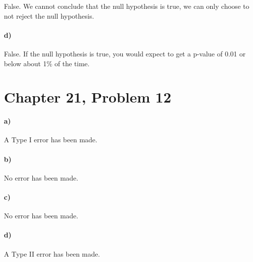 \documentclass[12pt]{article}
\begin{document}
False. We cannot conclude that the null hypothesis is true, we can only choose
to not reject the null hypothesis.

\paragraph{d)}

False. If the null hypothesis is true, you would expect to get a p-value of 0.01
or below about 1\% of the time.

\section*{Chapter 21, Problem 12}

\paragraph{a)}

A Type I error has been made.

\paragraph{b)}

No error has been made.

\paragraph{c)}

No error has been made.

\paragraph{d)}

A Type II error has been made.
\end{document}
